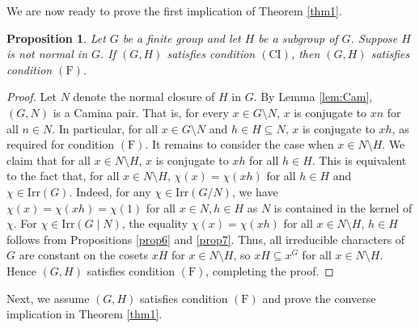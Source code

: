 \documentclass[twoside,a4paper,reqno,11pt]{amsart}
\newcommand{\<}{\langle}
\renewcommand{\>}{\rangle}
\newcommand{\Irr}{\mathrm {Irr}}
\newcommand{\F}{\mathrm{(F)}}
\newcommand{\CI}{\mathrm{(CI)}}
\renewcommand{\:}{\colon}
\newtheorem{prop}[thm]{Proposition}
\theoremstyle{definition}
\begin{document}
We are now ready to prove the first implication of Theorem \ref{thm1}.
\begin{prop}\label{propn15}
	Let $G$ be a finite group and let $H$ be a subgroup of $G$. Suppose $H$ is not normal in $G$. If $(G,H)$ satisfies condition $\CI$, then $(G,H)$ satisfies condition $\F$.
\end{prop}
\begin{proof}
	Let $N$ denote the normal closure of $H$ in $G$. By Lemma \ref{lem:Cam}, $(G,N)$ is a Camina pair. That is, for every $x\in G\setminus N$, $x$ is conjugate to $xn$ for all $n\in N$. In particular, for all $x\in G\setminus N$ and $h\in H\subseteq N$, $x$ is conjugate to $xh$, as required for condition $\F$. It remains to consider  the case when $x\in N\setminus H$. We claim that  for all $x\in N\setminus H$, $x$ is conjugate  to $xh$ for all $h\in H$. This is equivalent to the fact that, for all $x\in N\setminus H$, $\chi(x) = \chi(xh)$ for all $h\in H$ and $\chi\in \Irr(G)$. Indeed, for any $\chi\in \Irr(G/N)$, we have $\chi(x) = \chi(xh) = \chi(1)$ for all $x \in N, h\in H$ as $N$ is contained in the kernel of $\chi$.  For  $\chi \in \Irr(G\mid N)$, the equality $\chi(x) = \chi(xh)$ for all $x\in N\setminus H$, $h\in H$ follows from  Propositions \ref{prop6} and \ref{prop7}. Thus, all irreducible characters of $G$ are constant on the cosets $xH$ for $x\in N\setminus H$, so $xH\subseteq x^G$ for all $x\in N\setminus H.$ Hence $(G,H)$ satisfies condition $\F$, completing the proof.
\end{proof}

Next, we assume $(G,H)$ satisfies condition $\F$ and prove the converse implication in Theorem \ref{thm1}.  
\end{document}

